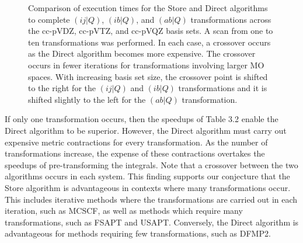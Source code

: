 \begin{figure}[H]
  \hfill
  \caption{Comparison of execution times for the Store and Direct algorithms to complete $(ij|Q)$, $(ib|Q)$, and $(ab|Q)$ transformations
across the cc-pVDZ, cc-pVTZ, and cc-pVQZ basis sets. A scan from one to ten transformations was performed. In each case, a crossover
occurs as the Direct algorithm becomes more expensive. The crossover occurs in fewer iterations for transformations involving larger MO spaces.
With increasing basis set size, the crossover point is shifted to the right for the $(ij|Q)$ and $(ib|Q)$
transformations and it is shifted slightly to the left for the $(ab|Q)$ transformation.}
\end{figure}

If only one transformation occurs, then the speedups of Table 3.2 enable the Direct algorithm to be superior. 
However, the Direct algorithm must carry out expensive metric contractions for every transformation. As the
number of transformations increase, the expense of these contractions
overtakes the speedups of pre-transforming the integrals. Note that a crossover between the two algorithms occurs in each system. 
This finding supports our conjecture that the Store algorithm is advantageous in contexts where many transformations occur. 
This includes iterative methods where the transformations
are carried out in each iteration, such as MCSCF, as well as methods which require many transformations, such as FSAPT and 
USAPT. Conversely, the Direct algorithm is advantageous for methods
requiring few transformations, such as DFMP2.

